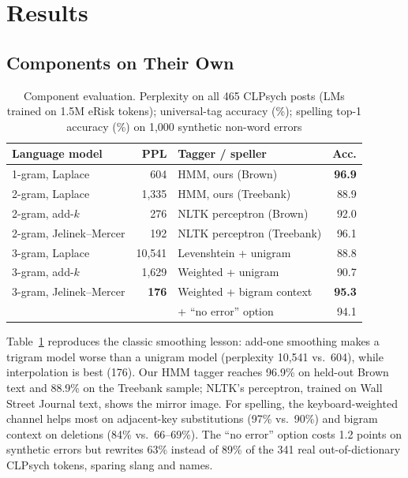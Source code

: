 \documentclass[conference]{IEEEtran}
\begin{document}
\section{Results}

\subsection{Components on Their Own}

\begin{table}[t]
\caption{Component evaluation. Perplexity on all 465 CLPsych posts (LMs trained on 1.5M eRisk tokens); universal-tag accuracy (\%); spelling top-1 accuracy (\%) on 1,000 synthetic non-word errors}
\label{tab:components}
\centering\footnotesize
\begin{tabular}{@{}lr@{\hspace{10pt}}lr@{}}
\toprule
Language model & PPL & Tagger / speller & Acc. \\
\midrule
1-gram, Laplace & 604 & HMM, ours (Brown) & \textbf{96.9} \\
2-gram, Laplace & 1,335 & HMM, ours (Treebank) & 88.9 \\
2-gram, add-$k$ & 276 & NLTK perceptron (Brown) & 92.0 \\
2-gram, Jelinek--Mercer & 192 & NLTK perceptron (Treebank) & 96.1 \\
3-gram, Laplace & 10,541 & Levenshtein + unigram & 88.8 \\
3-gram, add-$k$ & 1,629 & Weighted + unigram & 90.7 \\
3-gram, Jelinek--Mercer & \textbf{176} & Weighted + bigram context & \textbf{95.3} \\
 & & \quad + ``no error'' option & 94.1 \\
\bottomrule
\end{tabular}
\end{table}

Table~\ref{tab:components} reproduces the classic smoothing lesson: add-one smoothing makes a trigram model worse than a unigram model (perplexity 10,541 vs.\ 604), while interpolation is best (176). Our HMM tagger reaches 96.9\% on held-out Brown text and 88.9\% on the Treebank sample; NLTK's perceptron, trained on Wall Street Journal text, shows the mirror image. For spelling, the keyboard-weighted channel helps most on adjacent-key substitutions (97\% vs.\ 90\%) and bigram context on deletions (84\% vs.\ 66--69\%). The ``no error'' option costs 1.2 points on synthetic errors but rewrites 63\% instead of 89\% of the 341 real out-of-dictionary CLPsych tokens, sparing slang and names.
\end{document}
